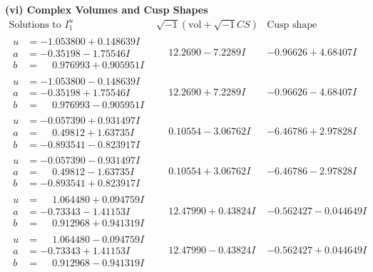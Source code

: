 \documentclass[1p]{elsarticle_modified}
\theoremstyle{definition}
\newcommand{\I}{\sqrt{-1}}
\begin{document}
\newpage\flushleft \textbf{(vi) Complex Volumes and Cusp Shapes}
$$\begin{array}{c|c|c}  
\text{Solutions to }I^u_{1}& \I (\text{vol} + \sqrt{-1}CS) & \text{Cusp shape}\\
 \hline 
\begin{aligned}
u &= -1.053800 + 0.148639 I \\
a &= -0.35198 - 1.75546 I \\
b &= \phantom{-}0.976993 + 0.905951 I\end{aligned}
 & \phantom{-}12.2690 - 7.2289 I & -0.96626 + 4.68407 I \\ \hline\begin{aligned}
u &= -1.053800 - 0.148639 I \\
a &= -0.35198 + 1.75546 I \\
b &= \phantom{-}0.976993 - 0.905951 I\end{aligned}
 & \phantom{-}12.2690 + 7.2289 I & -0.96626 - 4.68407 I \\ \hline\begin{aligned}
u &= -0.057390 + 0.931497 I \\
a &= \phantom{-}0.49812 + 1.63735 I \\
b &= -0.893541 - 0.823917 I\end{aligned}
 & \phantom{-}0.10554 - 3.06762 I & -6.46786 + 2.97828 I \\ \hline\begin{aligned}
u &= -0.057390 - 0.931497 I \\
a &= \phantom{-}0.49812 - 1.63735 I \\
b &= -0.893541 + 0.823917 I\end{aligned}
 & \phantom{-}0.10554 + 3.06762 I & -6.46786 - 2.97828 I \\ \hline\begin{aligned}
u &= \phantom{-}1.064480 + 0.094759 I \\
a &= -0.73343 - 1.41153 I \\
b &= \phantom{-}0.912968 + 0.941319 I\end{aligned}
 & \phantom{-}12.47990 + 0.43824 I & -0.562427 - 0.044649 I \\ \hline\begin{aligned}
u &= \phantom{-}1.064480 - 0.094759 I \\
a &= -0.73343 + 1.41153 I \\
b &= \phantom{-}0.912968 - 0.941319 I\end{aligned}
 & \phantom{-}12.47990 - 0.43824 I & -0.562427 + 0.044649 I \\ \hline\begin{aligned}

\end{aligned}
\end{array}$$
\end{document}
